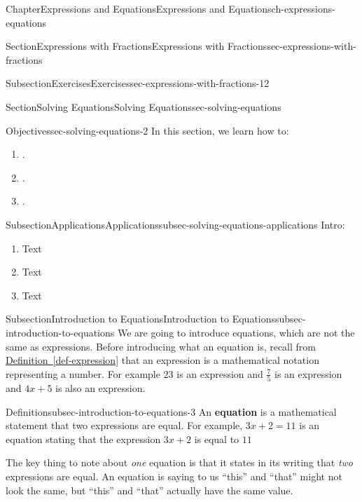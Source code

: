 \documentclass[twoside,11pt,]{book}
\newcommand{\xreffont}{\relax}
\newcommand{\terminology}[1]{\textbf{#1}}
\numberwithin{equation}{chapter}
\begin{document}
\begin{chapterptx}{Chapter}{Expressions and Equations}{}{Expressions and Equations}{}{}{ch-expressions-equations}
\begin{sectionptx}{Section}{Expressions with Fractions}{}{Expressions with Fractions}{}{}{sec-expressions-with-fractions}
\begin{subsectionptx}{Subsection}{Exercises}{}{Exercises}{}{}{sec-expressions-with-fractions-12}
%
\end{subsectionptx}
\end{sectionptx}
%
%
\typeout{************************************************}
\typeout{************************************************}
%
\begin{sectionptx}{Section}{Solving Equations}{}{Solving Equations}{}{}{sec-solving-equations}
\begin{objectives}{Objectives}{sec-solving-equations-2}
In this section, we learn how to:%
%
\begin{enumerate}
\item{}.%
\item{}.%
\item{}.%
\end{enumerate}
\end{objectives}
%
%
\typeout{************************************************}
\typeout{************************************************}
%
\begin{subsectionptx}{Subsection}{Applications}{}{Applications}{}{}{subsec-solving-equations-applications}
Intro:%
\begin{enumerate}
\item{}Text%
\item{}Text%
\item{}Text%
\end{enumerate}
%
\end{subsectionptx}
%
%
\typeout{************************************************}
\typeout{************************************************}
%
\begin{subsectionptx}{Subsection}{Introduction to Equations}{}{Introduction to Equations}{}{}{subsec-introduction-to-equations}
We are going to introduce equations, which are not the same as expressions. Before introducing what an equation is, recall from \hyperref[def-expression]{Definition~{\xreffont\ref{def-expression}}} that an expression is a mathematical notation representing a number. For example \(23\) is an expression and \(\frac75\) is an expression and \(4x+5\) is also an expression.%
\begin{definition}{Definition}{}{subsec-introduction-to-equations-3}%
An \terminology{equation} is a mathematical statement that two expressions are equal. For example, \(3x + 2 = 11\) is an equation stating that the expression \(3x + 2\) is equal to \(11\)%
\end{definition}
The key thing to note about \emph{one} equation is that it states in its writing that \emph{two} expressions are equal. An equation is saying to us ``this'' and ``that'' might not look the same, but ``this'' and ``that'' actually have the same value.%

\end{subsectionptx}
\end{sectionptx}
\end{chapterptx}
\end{document}
